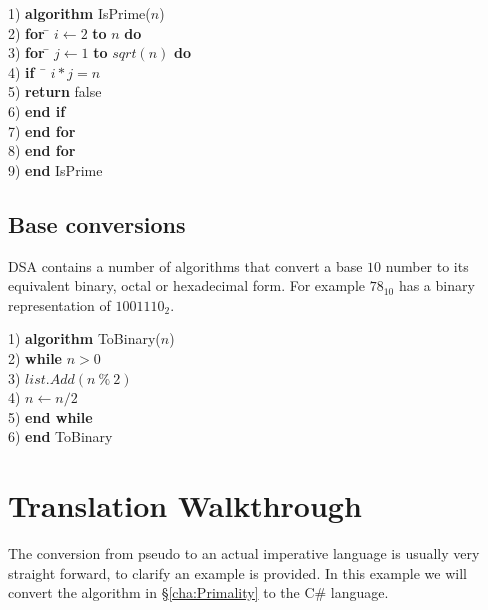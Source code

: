 \documentclass[10pt,oneside,a4paper]{report}
\begin{document}
\begin{tabbing}
1) \textbf{alg}\= \textbf{orithm} IsPrime($n$)\\
2) \> \textbf{for} \= $i \leftarrow 2$ \textbf{to} $n$ \textbf{do}\\
3) \> \> \textbf{for} \= $j \leftarrow 1$ \textbf{to} $sqrt(n)$ \textbf{do}\\
4) \> \> \> \textbf{if} ~\= $i * j = n$\\
5) \> \> \> \> \textbf{return} false\\
6) \> \> \> \textbf{end if}\\
7) \> \> \textbf{end for}\\	
8) \> \textbf{end for}\\
9) \textbf{end} IsPrime
\end{tabbing}

\section{Base conversions}
DSA contains a number of algorithms that convert a base $10$ number to its equivalent binary, octal or hexadecimal form. For example $78_{10}$ has a binary representation of $1001110_{2}$.

\begin{tabbing}
1) \textbf{alg}\= \textbf{orithm} ToBinary($n$)\\
2) \> \textbf{whi}\= \textbf{le} $n > 0$\\
3) \> \> $list.Add(n~\%~2)$\\
4) \> \> $n \leftarrow n / 2$\\
5) \> \textbf{end while}\\
6) \textbf{end} ToBinary\\
\end{tabbing}

\appendix
\chapter{Translation Walkthrough}
The conversion from pseudo to an actual imperative language is usually very straight forward, to clarify an example is provided.
In this example we will convert the algorithm in \S\ref{cha:Primality} to the C\# language.
\end{document}
